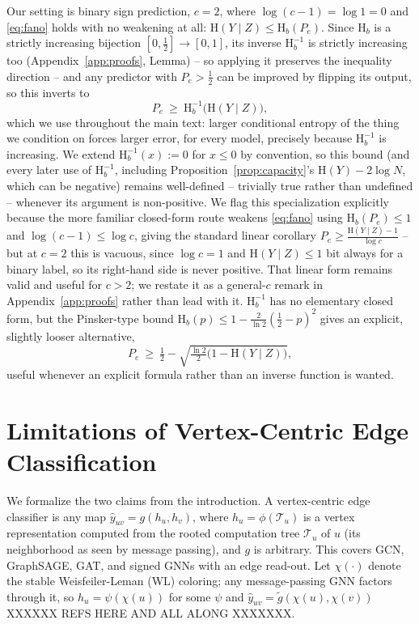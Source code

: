 \documentclass[letterpaper]{article} %
\newcommand{\Hh}{\mathrm{H}}
\theoremstyle{plain}
\theoremstyle{definition}
\begin{document}
Our setting is binary sign prediction, $c=2$, where $\log(c-1)=\log 1=0$ and \eqref{eq:fano} holds with no weakening at all: $\Hh(Y\mid Z)\le \Hh_b(P_e)$. Since $\Hh_b$ is a strictly increasing bijection $[0,\tfrac12]\to[0,1]$, its inverse $\Hh_b^{-1}$ is strictly increasing too (Appendix~\ref{app:proofs}, Lemma) -- so applying it preserves the inequality direction -- and any predictor with $P_e>\tfrac12$ can be improved by flipping its output, so this inverts to
\[
P_e\ \ge\ \Hh_b^{-1}\big(\Hh(Y\mid Z)\big),
\]
which we use throughout the main text: larger conditional entropy of the thing we condition on forces larger error, for every model, precisely because $\Hh_b^{-1}$ is increasing. We extend $\Hh_b^{-1}(x):=0$ for $x\le 0$ by convention, so this bound (and every later use of $\Hh_b^{-1}$, including Proposition~\ref{prop:capacity}'s $\Hh(Y)-2\log N$, which can be negative) remains well-defined -- trivially true rather than undefined -- whenever its argument is non-positive. We flag this specialization explicitly because the more familiar closed-form route weakens \eqref{eq:fano} using $\Hh_b(P_e)\le 1$ and $\log(c-1)\le\log c$, giving the standard linear corollary $P_e\ge\tfrac{\Hh(Y\mid Z)-1}{\log c}$ -- but at $c=2$ this is vacuous, since $\log c=1$ and $\Hh(Y\mid Z)\le 1$ bit always for a binary label, so its right-hand side is never positive. That linear form remains valid and useful for $c>2$; we restate it as a general-$c$ remark in Appendix~\ref{app:proofs} rather than lead with it. $\Hh_b^{-1}$ has no elementary closed form, but the Pinsker-type bound $\Hh_b(p)\le 1-\tfrac{2}{\ln 2}(\tfrac12-p)^2$ gives an explicit, slightly looser alternative,
\[
P_e\ \ge\ \tfrac12-\sqrt{\tfrac{\ln 2}{2}\big(1-\Hh(Y\mid Z)\big)},
\]
useful whenever an explicit formula rather than an inverse function is wanted.

\section{Limitations of Vertex-Centric Edge Classification}
We formalize the two claims from the introduction. A vertex-centric edge classifier is any map $\hat y_{uv}=g(h_u,h_v)$, where $h_u=\phi(\mathcal{T}_u)$ is a vertex representation computed from the rooted computation tree $\mathcal{T}_u$ of $u$ (its neighborhood as seen by message passing), and $g$ is arbitrary. This covers GCN, GraphSAGE, GAT, and signed GNNs with an edge read-out. 
Let $\chi(\cdot)$ denote the stable Weisfeiler-Leman (WL) coloring; any message-passing GNN factors through it, so $h_u=\psi(\chi(u))$ for some $\psi$ and $\hat y_{uv}=\tilde g(\chi(u),\chi(v))$ XXXXXX REFS HERE AND ALL ALONG XXXXXXX.
\end{document}
